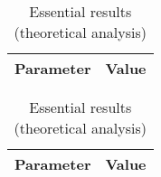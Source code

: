 \newpage

\begin{table}[!htb]
  \begin{minipage}{.5\linewidth}
     \centering
  \begin{tabular}{|c|c|}
    \hline    
    {\bf Parameter} & {\bf Value} \\ \hline
    
    
 \end{tabular}
 \caption{Essentia lresults (simulation analysis)}
 \label{tab:sim}
  \end{minipage}
    \hspace{2 mm}
    \begin{minipage}{.5\linewidth}
      \centering
        \begin{tabular}{|c|c|}
    \hline    
    {\bf Parameter} & {\bf Value} \\ \hline
    
    
 \end{tabular}
        \caption{Essential results (theoretical analysis)}
        \label{tab:compsim}
    \end{minipage} 
\end{table}

